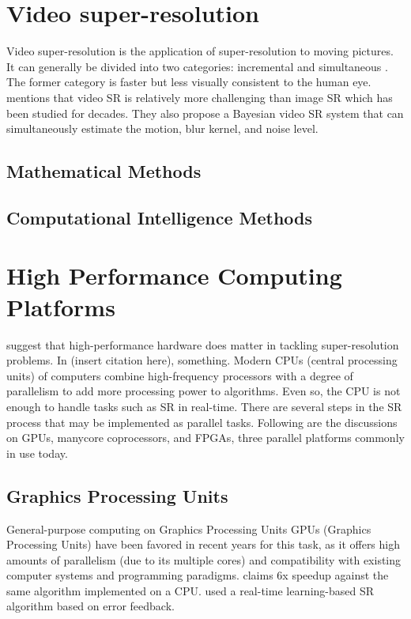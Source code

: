 \section{Video super-resolution}

Video super-resolution is the application of super-resolution to moving pictures.
It can generally be divided into two categories: incremental and simultaneous \citep{Su2011}. The former category is faster but less visually consistent to the human eye.
\cite{Liu2014} mentions that video SR is relatively more challenging than image SR which has been studied for decades. 
They also propose a Bayesian video SR system that can simultaneously estimate the motion, blur kernel, and noise level.

\subsection{Mathematical Methods}




\subsection{Computational Intelligence Methods}


\section{High Performance Computing Platforms}
\cite{Yang2010a} suggest that high-performance hardware does matter in tackling super-resolution problems. In (insert citation here), something. 
Modern CPUs (central processing units) of computers combine high-frequency processors with a degree of parallelism to add more processing power to algorithms.
Even so, the CPU is not enough to handle tasks such as SR in real-time.
There are several steps in the SR process that may be implemented as parallel tasks.
Following are the discussions on GPUs, manycore coprocessors, and FPGAs, three parallel platforms commonly in use today.

\subsection{Graphics Processing Units}
General-purpose computing on Graphics Processing Units
GPUs (Graphics Processing Units) have been favored in recent years for this task, as it offers high amounts of parallelism (due to its multiple cores) and compatibility with existing computer systems and programming paradigms.
\cite{Wu2011} claims 6x speedup against the same algorithm implemented on a CPU. 
\cite{Shen2014} used a real-time learning-based SR algorithm based on error feedback. 

